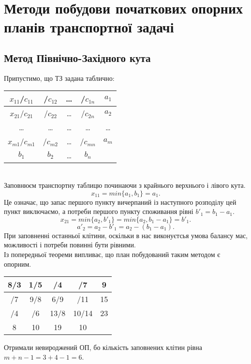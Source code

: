 \documentclass[12pt,a4paper]{book}
\begin{document}
\section{Методи побудови початкових опорних планів транспортної задачі}
\subsection{Метод Північно-Західного кута}
Припустимо, що ТЗ задана таблично:\\
\begin{tabular}{ | c | c | c | c | c |}
\hline
$x_{11}$/$c_{11}$	&	/$c_{12}$	&	\dots	&	/$c_{1n}$	&	$a_1$\\
\hline
$x_{21}$/$c_{21}$	&	/$c_{22}$	&	\dots	&	/$c_{2n}$	&	$a_2$\\
\hline
\dots	&	\dots	&	\dots	&	\dots	&	\dots\\
\hline
$x_{m1}$/$c_{m1}$	&	/$c_{m2}$	&	\dots	&	/$c_{mn}$	&	$a_m$\\
\hline
$b_1$	&	$b_2$	&	\dots	&	$b_n$	&\\
\hline
\end{tabular}\\
Заповнюєм транспортну таблицю починаючи з крайнього верхнього і лівого кута.\\
$$x_{11} = min\{a_1,b_1\}=a_1.$$
Це означає, що запас першого пункту вичерпаний із наступного розподілу цей пункт виключаємо, а потреби першого пункту споживання рівні $b'_1=b_1-a_1$.
$$x_{21} = min\{a_2,b'_1\} = min\{a_2,b_1-a_1\} = b'_1.$$
$$a'_2=a_2-b'_1=a_2-(b_1-a_1).$$
При заповненні останньої клітини, оскільки в нас виконуєтсья умова балансу мас, можливості і потреби повинні бути рівними.\\
Із попередньої теореми випливає, що план побудований таким методом є опорним.\\
\begin{tabular}{ | c | c | c | c | c |}
\hline
8/3	&	1/5	&	/4	&	/7		&	9\\
\hline
/7	&	9/8	&	6/9	&	/11		&	15\\
\hline
/4	&	/6	&	13/8	&	10/14	&	23\\
\hline
8	&	10	&	19	&	10		&\\
\hline
\end{tabular}
Отримали невироджений ОП, бо кількість заповнених клітин рівна $m+n-1 = 3+4-1 = 6$.\\
\end{document}
